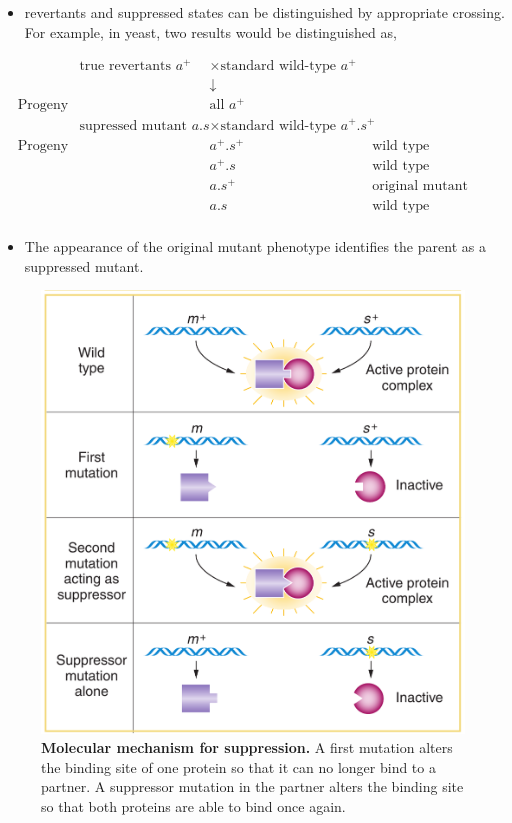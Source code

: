 \documentclass[11pt,dvipsnames,ignorenonframetext,aspectratio=169]{beamer}
\providecommand{\tightlist}{%
  \setlength{\itemsep}{0pt}\setlength{\parskip}{0pt}}
\begin{document}
\begin{frame}{}
\protect\hypertarget{section-23}{}
\begin{itemize}
\tightlist
\item
  revertants and suppressed states can be distinguished by appropriate
  crossing. For example, in yeast, two results would be distinguished
  as,
\end{itemize}

\[
\begin{aligned}
&& \textrm{true revertants }a^+ &\times \textrm{standard wild-type }a^+ & \\
&&& \downarrow & \\
& \textrm{Progeny} && \textrm{all } a^+ & \\
&& \textrm{supressed mutant } a.s &\times \textrm{standard wild-type } a^+.s^+ & \\
& \textrm{Progeny} && a^+. s^+ & \textrm{wild type} & \\
& && a^+. s & \textrm{wild type} & \\
& && a. s^+ & \textrm{original mutant} & \\
& && a. s & \textrm{wild type (supressed)} & \\
\end{aligned}
\]

\begin{itemize}
\tightlist
\item
  The appearance of the original mutant phenotype identifies the parent
  as a suppressed mutant.
\end{itemize}
\end{frame}

\begin{frame}{}
\protect\hypertarget{section-24}{}
\begin{figure}

{\centering \includegraphics[width=0.4\linewidth]{./../images/molecular_basis_suppression} 

}

\caption{\textbf{Molecular mechanism for suppression.} A first mutation alters the binding site of one protein so that it can no longer bind to a partner. A suppressor mutation in the partner alters the binding site so that both proteins are able to bind once again.}\label{fig:gene-suppression}
\end{figure}
\end{frame}
\end{document}
